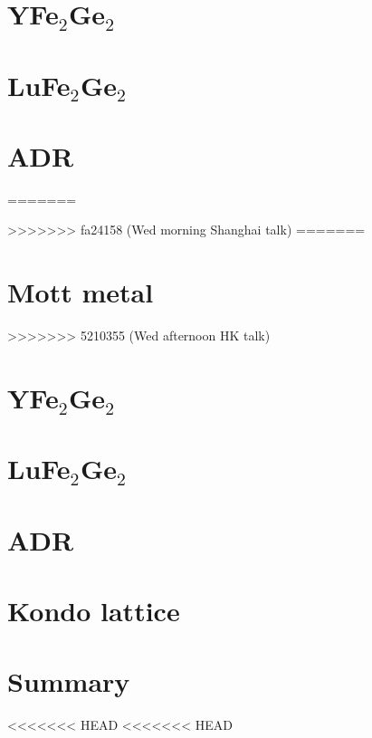 \section{YFe$_2$Ge$_2$}


\section{LuFe$_2$Ge$_2$}

% 

\section{ADR}

=======

>>>>>>> fa24158 (Wed morning Shanghai talk)
=======
\section{Mott metal}

>>>>>>> 5210355 (Wed afternoon HK talk)


\section{YFe$_2$Ge$_2$}
%


\section{LuFe$_2$Ge$_2$}

% 
\section{ADR}




\section{Kondo lattice}


%


\section{Summary}



\appendix




<<<<<<< HEAD
<<<<<<< HEAD

